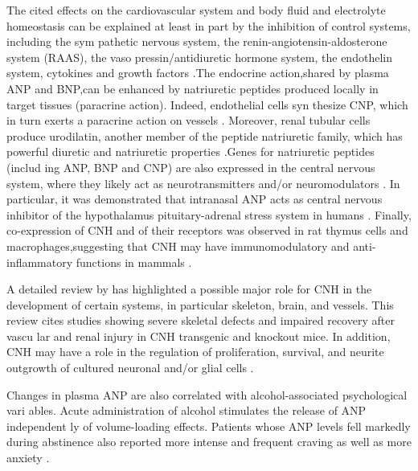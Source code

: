 \documentclass[14pt,a4paper,onecolumn]{extarticle}
\begin{document}
The cited effects on the cardiovascular system and body fluid and electrolyte homeostasis can be explained at least in part by the inhibition of control systems, including the sym pathetic nervous system, the renin-angiotensin-aldosterone system (RAAS), the vaso pressin/antidiuretic hormone system, the endothelin system, cytokines and growth factors \citep{90} \citep{96} \citep{97} \citep{98} \citep{99}.The endocrine action,shared by plasma ANP and BNP,can be enhanced by natriuretic peptides produced locally in target tissues (paracrine action). Indeed, endothelial cells syn thesize CNP, which in turn exerts a paracrine action on vessels \citep{86} \citep{87} \citep{88}. Moreover, renal tubular cells produce urodilatin, another member of the peptide natriuretic family, which has powerful diuretic and natriuretic properties \citep{100}.Genes for natriuretic peptides (includ ing ANP, BNP and CNP) are also expressed in the central nervous system, where they likely act as neurotransmitters and/or neuromodulators \citep{93} \citep{100}. In particular, it was demonstrated that intranasal ANP acts as central nervous inhibitor of the hypothalamus pituitary-adrenal stress system in humans \citep{103}. Finally, co-expression of CNH and of their receptors was observed in rat thymus cells and macrophages,suggesting that CNH may have immunomodulatory and anti-inflammatory functions in mammals \citep{106}.

A  detailed review by \citep{107} has highlighted a possible major role for CNH in the development of certain systems, in particular skeleton, brain, and vessels. This review cites  studies showing severe skeletal defects and impaired recovery after vascu lar and renal injury in CNH transgenic and knockout mice. In addition, CNH may have a role in the regulation of proliferation, survival, and neurite outgrowth of cultured neuronal and/or glial cells \citep{107}.

Changes in plasma ANP are also correlated with alcohol-associated psychological vari ables. Acute administration of alcohol stimulates the release of ANP independent ly of volume-loading effects. Patients whose ANP levels fell markedly during abstinence also reported more intense and frequent craving as well as more anxiety \citep{108}.
\end{document}
